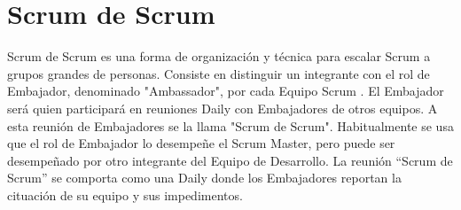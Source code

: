 \section{Scrum de Scrum}

Scrum de Scrum es una forma de organización y técnica para escalar Scrum a grupos grandes de personas. Consiste en distinguir un integrante con el rol de Embajador, denominado "Ambassador", por cada Equipo Scrum \cite{Stefanini-2013}. El Embajador será quien participará en reuniones Daily con Embajadores de otros equipos. A esta reunión de Embajadores se la llama "Scrum de Scrum". Habitualmente se usa que el rol de Embajador lo desempeñe el Scrum Master, pero puede ser desempeñado por otro integrante del Equipo de Desarrollo. La reunión “Scrum de Scrum” se comporta como una Daily donde los Embajadores reportan la cituación de su equipo y sus impedimentos.


